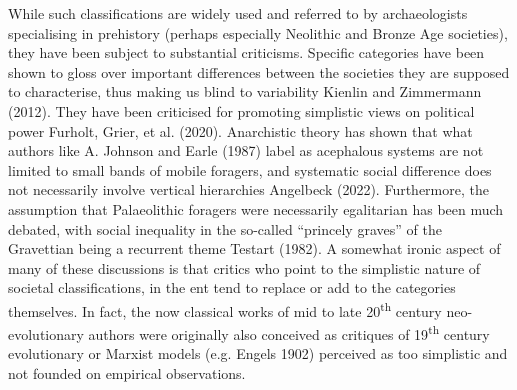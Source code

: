 \documentclass[
  12pt,
  a4paper, twoside]{book}
\begin{document}
While such classifications are widely used and referred to by archaeologists specialising in prehistory (perhaps especially Neolithic and Bronze Age societies), they have been subject to substantial criticisms. Specific categories have been shown to gloss over important differences between the societies they are supposed to characterise, thus making us blind to variability Kienlin and Zimmermann (2012). They have been criticised for promoting simplistic views on political power Furholt, Grier, et al. (2020). Anarchistic theory has shown that what authors like A. Johnson and Earle (1987) label as acephalous systems are not limited to small bands of mobile foragers, and systematic social difference does not necessarily involve vertical hierarchies Angelbeck (2022). Furthermore, the assumption that Palaeolithic foragers were necessarily egalitarian has been much debated, with social inequality in the so-called ``princely graves'' of the Gravettian being a recurrent theme Testart (1982). A somewhat ironic aspect of many of these discussions is that critics who point to the simplistic nature of societal classifications, in the ent tend to replace or add to the categories themselves. In fact, the now classical works of mid to late 20\textsuperscript{th} century neo-evolutionary authors were originally also conceived as critiques of 19\textsuperscript{th} century evolutionary or Marxist models (e.g. Engels 1902) perceived as too simplistic and not founded on empirical observations.
\end{document}
